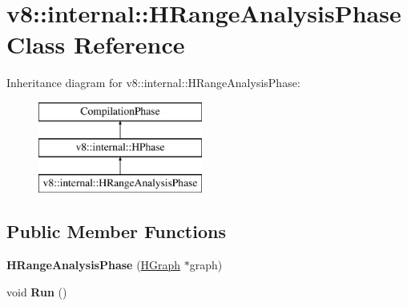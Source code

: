 \hypertarget{classv8_1_1internal_1_1_h_range_analysis_phase}{}\section{v8\+:\+:internal\+:\+:H\+Range\+Analysis\+Phase Class Reference}
\label{classv8_1_1internal_1_1_h_range_analysis_phase}
Inheritance diagram for v8\+:\+:internal\+:\+:H\+Range\+Analysis\+Phase\+:\begin{figure}[H]
\begin{center}
\leavevmode
\includegraphics[height=3.000000cm]{classv8_1_1internal_1_1_h_range_analysis_phase}
\end{center}
\end{figure}
\subsection*{Public Member Functions}
\begin{DoxyCompactItemize}
\item 
{\bfseries H\+Range\+Analysis\+Phase} (\hyperlink{classv8_1_1internal_1_1_h_graph}{H\+Graph} $\ast$graph)\hypertarget{classv8_1_1internal_1_1_h_range_analysis_phase_aedf3f369c4c99b18c01974dbf1be898f}{}\label{classv8_1_1internal_1_1_h_range_analysis_phase_aedf3f369c4c99b18c01974dbf1be898f}

\item 
void {\bfseries Run} ()\hypertarget{classv8_1_1internal_1_1_h_range_analysis_phase_a0569cf1f523621c5c967baccc95c12e8}{}\label{classv8_1_1internal_1_1_h_range_analysis_phase_a0569cf1f523621c5c967baccc95c12e8}

\end{DoxyCompactItemize}
